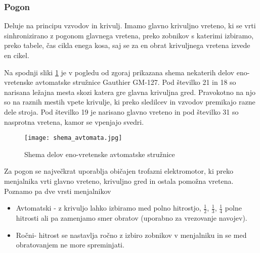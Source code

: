 \subsubsection{Pogon}
Deluje na principu vzvodov in krivulj. Imamo glavno krivuljno
vreteno, ki se vrti sinhronizirano z pogonom glavnega vretena,
preko zobnikov s katerimi izbiramo, preko tabele, čas cikla enega
kosa, saj se za en obrat krivuljnega vretena izvede en cikel.

Na spodnji sliki \ref{pogon} je v pogledu od zgoraj prikazana shema
nekaterih delov eno-vretenske avtomatske stružnice Gauthier GM-127. Pod številko 21 in 18
so narisana ležajna mesta skozi katera gre glavna krivuljna gred.
Pravokotno na njo so na raznih mestih vpete krivulje, ki preko sledilcev
in vzvodov premikajo razne dele stroja. Pod številko 19 je narisano
glavno vreteno in pod številko 31 so nasprotna vretena, kamor se vpenjajo svedri.
\begin{figure}[H]
	\begin{center}
		\texttt{[image: shema\_avtomata.jpg]}
		\caption{Shema delov eno-vretenske avtomatske stružnice
			\cite{gauthier}}
		\label{pogon}
	\end{center}
\end{figure}
Za pogon se največkrat uporablja običajen trofazni elektromotor,
ki preko menjalnika vrti glavno vreteno, krivuljno gred in ostala
pomožna vretena. Poznamo pa dve vrsti menjalnikov
\begin{itemize}
	\item Avtomatski - z krivuljo lahko izbiramo med polno
	      hitrostjo, \( \frac{1}{2} \), \( \frac{1}{3} \), \( \frac{1}{4} \)
	      polne hitrosti ali pa zamenjamo
	      smer obratov (uporabno za vrezovanje navojev).

	\item Ročni- hitrost se nastavlja ročno z izbiro zobnikov
	      v menjalniku in se med obratovanjem ne more spreminjati.
\end{itemize}

